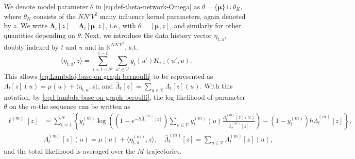 \documentclass[11pt]{article}
\theoremstyle{remark}
\theoremstyle{plain}
\newcommand{\calV}{\mathcal{V}}
\newcommand{\R}{\mathbb{R}}
\begin{document}
We denote model parameter $\theta$ in \eqref{eq:def-theta-network-Omega} as $\theta = \{ \boldsymbol \mu\} \cup \theta_K$, 
where $\theta_K$ consists of the $NN' V^2$ many influence kernel parameters, again denoted by $z$. 
We write $\mathbf{\Lambda}_t[z] = \mathbf{\Lambda}_t [\boldsymbol \mu, z]$, i.e., with $\theta = [\boldsymbol \mu, z]$, and similarly for other quantities depending on $\theta$. 
Next, we introduce the data history vector $\eta_{t,u}$, doubly indexed by $t$ and $u$ and  in $\R^{NN' V^2}$, s.t.
\begin{equation}\label{eq:def-innerprod-etatu-K-graph}
\langle \eta_{t, u}, z \rangle = \sum_{ i = t-N'}^{t-1}  \sum_{u' \in \calV } y_i(u')  K_{i, t}(u', u).
\end{equation}
This allows \eqref{eq:Lambdaj-base-on-graph-bernoulli} to be represented as 
$\Lambda_t [z] (u)  = \mu(u) + \langle \eta_{t, u}, z \rangle$,
 and $\bar \Lambda_t [z] = \sum_{u \in \calV} \Lambda_t [z] (u)$. 
%
With this notation, by \eqref{eq:l-lambda-base-on-graph-beroulli}, the log-likelihood of parameter $\theta$ on the $m$-the sequence can be written as 
\begin{align}
\ell^{(m)}[z] 
& = \sum_{t=1}^N \left\{ 
		\bar{y}^{(m)}_t \log \left(  (1- e^{- h \bar{\Lambda}^{(m)}_{t}[z]} )  
		\sum_{u \in \calV} y_t^{(m)}(u) \frac{ \Lambda^{(m)}_{t}[z] (u) }{ \bar{\Lambda}^{(m)}_{t}[z]} \right) 
		-   (1- \bar{y}^{(m)}_t)h \bar{\Lambda}^{(m)}_t[z] \right\},  
		\label{eq:lm-z-graph}\\
& \Lambda_t^{(m)} [z] (u) 
 = \mu(u) + \langle \eta^{(m)}_{t, u}, z \rangle, \quad 		
 	\bar \Lambda_t^{(m)} [z] = \sum_{u \in \calV} \Lambda_t^{(m)} [z] (u),
	\label{eq:lambdatm-z-graph}
\end{align}
and the total likelihood is averaged over the $M$ trajectories. 
\end{document}
